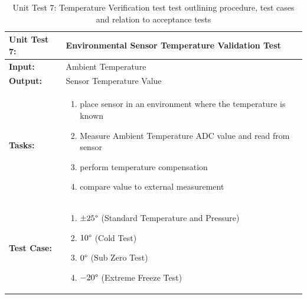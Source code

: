 \begin{table}[H]
    \centering
    \caption{Unit Test 7: Temperature Verification test  test outlining procedure, test cases and relation to acceptance tests}
    \begin{tabular}{|m{}|m{}|}
    \hline
       \textbf{Unit Test 7: }  &  Environmental Sensor Temperature Validation Test\\
       \hline
        \textbf{Input: } &  Ambient Temperature\\
        \hline
        \textbf{Output: } &  Sensor Temperature Value\\
        \hline
        \textbf{Tasks: } & \begin{enumerate}
        \vspace{1mm}
            \item place sensor in an environment where the temperature is known
            \item Measure Ambient Temperature ADC value and read from sensor
            \item perform temperature compensation
            \item compare value to external measurement
        \end{enumerate}\\
        \hline
        \textbf{Test Case: } & \begin{enumerate}
            \vspace{1mm}
            \item $\pm 25\degree$ (Standard Temperature and Pressure)
            \item $10 \degree$ (Cold Test)
            \item $0\degree$ (Sub Zero Test)
            \item $-20 \degree$ (Extreme Freeze Test)
        \end{enumerate}\\
        \hline
    \end{tabular}

    \label{tab:UT007}
\end{table}

